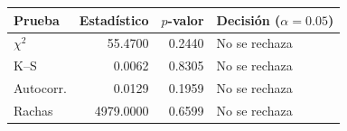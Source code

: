 \begin{tabular}{lrrl}
\toprule
Prueba & Estadístico & $p$-valor & Decisión ($\alpha=0.05$) \\
\midrule
$\chi^2$ & 55.4700 & 0.2440 & No se rechaza \\
K--S & 0.0062 & 0.8305 & No se rechaza \\
Autocorr. & 0.0129 & 0.1959 & No se rechaza \\
Rachas & 4979.0000 & 0.6599 & No se rechaza \\
\bottomrule
\end{tabular}
